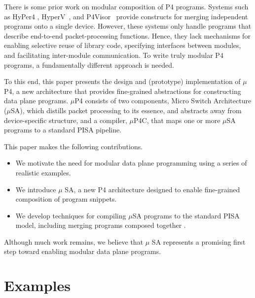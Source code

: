 There is some prior work on modular composition of P4 programs.
Systems such as HyPer4 \cite{Hancock:2016:HUP:2999572.2999607},
HyperV~\cite{8038396}, and
P4Visor~\cite{Zheng:2018:PLV:3281411.3281436} provide constructs for
merging independent programs onto a single device. However, these
systems only handle programs that describe end-to-end
packet-processing functions. Hence, they lack mechanisms for enabling
selective reuse of library code, specifying interfaces between
modules, and facilitating inter-module communication. To write truly
modular P4 programs, a fundamentally different approach is needed.

To this end, this paper presents the design and (prototype)
implementation of $\mu$P4, a new architecture that provides
fine-grained abstractions for constructing data plane programs.
$\mu$P4 consists of two components, Micro Switch Architecture
($\mu$SA), which distills packet processing to its essence, and
abstracts away from device-specific structure, and a compiler,
$\mu$P4C, that maps one or more $\mu$SA programs to a standard PISA
pipeline. 

This paper makes the following contributions.
\begin{itemize}
\item We motivate the need for modular data plane programming using a
  series of realistic examples.
\item We introduce $\mu$ SA, a new P4 architecture designed to enable
  fine-grained composition of program snippets.
\item We develop techniques for compiling $\mu$SA programs to the
  standard PISA model, including merging programs composed together 
  .
\end{itemize}

Although much work remains, we believe that $\mu$ SA represents a
promising first step toward enabling modular data plane programs.


\section{Examples}

